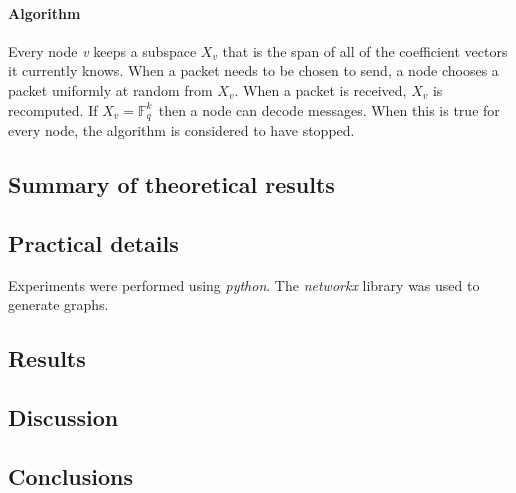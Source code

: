 \documentclass{article} %
\def\numMessages{\textit{k}\,}
\def\fieldSize{\textit{q}\,}
\begin{document}
\paragraph{Algorithm}
Every node \textit{v} keeps a subspace $X_v$ that is the span of all of the coefficient vectors it currently knows. When a packet needs to be chosen to send, a node chooses a packet uniformly at random from $X_v$. When a packet is received, $X_v$ is recomputed. If $X_v = \mathbb{F}_{\fieldSize}^{\numMessages}$ then a node can decode messages. When this is true for every node, the algorithm is considered to have stopped. 


\subsection{Summary of theoretical results}

\subsection{Practical details}
Experiments were performed using \textit{python}. The \textit{networkx} library was used to generate graphs.

\subsection{Results}
\begin{figure}
\centering
{}
\label{fig:runtimes}
\end{figure} 

\subsection{Discussion}

\subsection{Conclusions}


\end{document}
